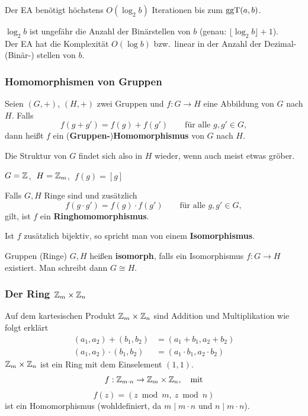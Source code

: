 \begin{satz}
Der EA benötigt höchstens $O(\log_2 b)$ Iterationen bis zum $\operatorname{ggT}(a, b)$.
\end{satz}

$\log_2 b$ ist ungefähr die Anzahl der Binärstellen von $b$ (genau: $\lfloor \log_2 b \rfloor + 1$).\\
Der EA hat die Komplexität $O(\log b)$ bzw.\ linear in der Anzahl der Dezimal- (Binär-) stellen von $b$.

\subsubsection*{Homomorphismen von Gruppen}

\begin{definition}
Seien $(G,+)$, $(H,+)$ zwei Gruppen und $f : G \to H$ eine Abbildung von $G$ nach $H$. Falls
\[ f(g + g') = f(g) + f(g') \qquad \text{für alle } g, g' \in G, \]
dann heißt $f$ ein (\textbf{Gruppen-})\textbf{Homomorphismus} von $G$ nach $H$.
\end{definition}

Die Struktur von $G$ findet sich also in $H$ wieder, wenn auch meist etwas gröber.

\begin{beispiel}
$G = \mathbb{Z}$, $\;H = \mathbb{Z}_{m}$, $\;f(g) = [g]$
\end{beispiel}

\begin{definition}
Falls $G, H$ Ringe sind und zusätzlich
\[ f(g \cdot g') = f(g) \cdot f(g') \qquad \text{für alle } g, g' \in G, \]
gilt, ist $f$ ein \textbf{Ringhomomorphismus}.

Ist $f$ zusätzlich bijektiv, so spricht man von einem \textbf{Isomorphismus}.

Gruppen (Ringe) $G, H$ heißen \textbf{isomorph}, falls ein Isomorphismus $f : G \to H$ existiert. Man schreibt dann $G \cong H$.
\end{definition}

\subsubsection*{Der Ring $\mathbb{Z}_{m} \times \mathbb{Z}_{n}$}

Auf dem kartesischen Produkt $\mathbb{Z}_{m} \times \mathbb{Z}_{n}$ sind Addition und Multiplikation wie folgt erklärt
\begin{align*}
(a_1, a_2) + (b_1, b_2) &= (a_1 + b_1, a_2 + b_2) \\
(a_1, a_2) \cdot (b_1, b_2) &= (a_1 \cdot b_1, a_2 \cdot b_2)
\end{align*}
$\mathbb{Z}_{m} \times \mathbb{Z}_{n}$ ist ein Ring mit dem Einselement $(1, 1)$.
\[ f : \mathbb{Z}_{m \cdot n} \to \mathbb{Z}_{m} \times \mathbb{Z}_{n}, \quad \text{mit} \]
\[ f(z) = (z \bmod m,\ z \bmod n) \]
ist ein Homomorphismus (wohldefiniert, da $m \mid m \cdot n$ und $n \mid m \cdot n$).

